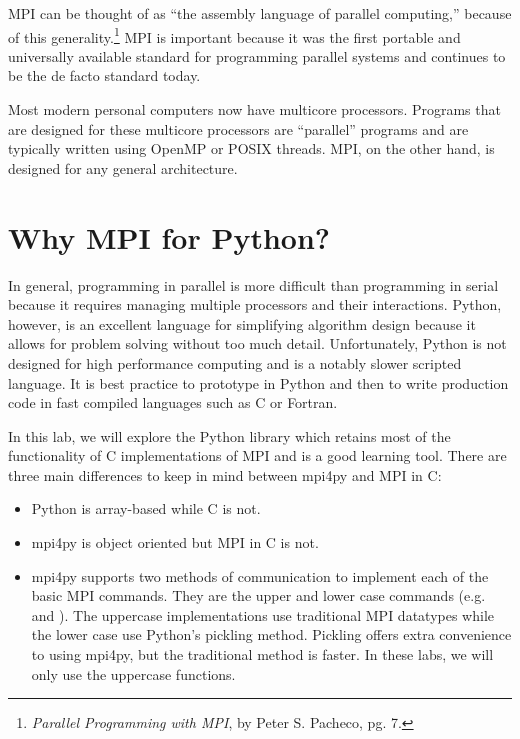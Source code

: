 MPI can be thought of as ``the assembly language of parallel computing,'' because of this generality.\footnote{\emph{Parallel Programming with MPI}, by Peter S. Pacheco, pg. 7.}
MPI is important because it was the first portable and universally available standard for programming parallel systems and continues to be the de facto standard today.

\begin{info}
Most modern personal computers now have multicore processors.
Programs that are designed for these multicore processors are ``parallel'' programs and are typically written using OpenMP or POSIX threads.
MPI, on the other hand, is designed for any general architecture.
\end{info}

\section*{Why MPI for Python?}
In general, programming in parallel is more difficult than programming in serial because it requires managing multiple processors and their interactions.
Python, however, is an excellent language for simplifying algorithm design because it allows for problem solving without too much detail.
Unfortunately, Python is not designed for high performance computing and is a notably slower scripted language.
It is best practice to prototype in Python and then to write production code in fast compiled languages such as C or Fortran.

In this lab, we will explore the Python library  which retains most of the functionality of C implementations of MPI and is a good learning tool.
There are three main differences to keep in mind between mpi4py and MPI in C:
\begin{itemize}
    \item Python is array-based while C is not.
    \item mpi4py is object oriented but MPI in C is not.
    \item mpi4py supports two methods of communication to implement each of the basic MPI commands.
    They are the upper and lower case commands (e.g.  and ).
    The uppercase implementations use traditional MPI datatypes while the lower case use
    Python's pickling method. Pickling offers extra convenience to using mpi4py,
    but the traditional method is faster. In these labs, we will only use the uppercase functions.
\end{itemize}

